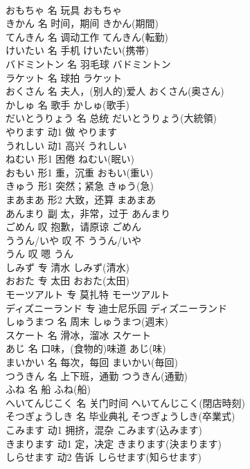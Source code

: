 \documentclass[8pt]{extreport}
\begin{document}
\begin{CJK}{UTF8}{min}
\\	おもちゃ	名	玩具	おもちゃ	
\\	きかん	名	时间，期间	きかん(期間)	
\\	てんきん	名	调动工作	てんきん(転勤)	
\\	けいたい	名	手机	けいたい(携帯)	
\\	バドミントン	名	羽毛球	バドミントン	
\\	ラケット	名	球拍	ラケット	
\\	おくさん	名	夫人，(别人的)爱人	おくさん(奥さん)	
\\	かしゅ	名	歌手	かしゅ(歌手)	
\\	だいとうりょう	名	总统	だいとうりょう(大統領)	
\\	やります	动1	做	やります	
\\	うれしい	动1	高兴	うれしい	
\\	ねむい	形1	困倦	ねむい(眠い)	
\\	おもい	形1	重，沉重	おもい(重い)	
\\	きゅう	形1	突然；紧急	きゅう(急)	
\\	まあまあ	形2	大致，还算	まあまあ	
\\	あんまり	副	太，非常，过于	あんまり	
\\	ごめん	叹	抱歉，请原谅	ごめん	
\\	ううん/いや	叹	不	ううん/いや	
\\	うん	叹	嗯	うん	
\\	しみず	专	清水	しみず(清水)	
\\	おおた	专	太田	おおた(太田)	
\\	モーツアルト	专	莫扎特	モーツアルト	
\\	ディズニーランド	专	迪士尼乐园	ディズニーランド	
\\	しゅうまつ	名	周末	しゅうまつ(週末)	
\\	スケート	名	滑冰，溜冰	スケート	
\\	あじ	名	口味，(食物的)味道	あじ(味)	
\\	まいかい	名	每次，每回	まいかい(毎回)	
\\	つうきん	名	上下班，通勤	つうきん(通勤)	
\\	ふね	名	船	ふね(船)	
\\	へいてんじこく	名	关门时间	へいてんじこく(閉店時刻)	
\\	そつぎょうしき	名	毕业典礼	そつぎょうしき(卒業式)	
\\	こみます	动1	拥挤，混杂	こみます(込みます)	
\\	きまります	动1	定，决定	きまります(決まります)	
\\	しらせます	动2	告诉	しらせます(知らせます)	

\end{CJK}
\end{document}
